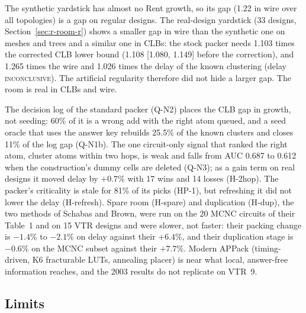  The synthetic yardstick has almost no Rent growth, so its gap (1.22 in wire over all topologies) is a gap on regular designs. The real-design yardstick (33 designs, Section~\ref{sec:r-room-r}) shows a smaller gap in wire than the synthetic one on meshes and trees and a similar one in CLBs: the stock packer needs 1.103 times the corrected CLB lower bound (1.108 [1.080, 1.149] before the correction), and 1.265 times the wire and 1.026 times the delay of the known clustering (delay \textsc{inconclusive}). The artificial regularity therefore did not hide a larger gap. The room is real in CLBs and wire.

 The decision log of the standard packer (Q-N2) places the CLB gap in growth, not seeding: 60\% of it is a wrong add with the right atom queued, and a seed oracle that uses the answer key rebuilds 25.5\% of the known clusters and closes 11\% of the log gap (Q-N1b). The one circuit-only signal that ranked the right atom, cluster atoms within two hops, is weak and falls from AUC 0.687 to 0.612 when the construction's dummy cells are deleted (Q-N3); as a gain term on real designs it moved delay by $+0.7\%$ with 17 wins and 14 losses (H-2hop). The packer's criticality is stale for 81\% of its picks (HP-1), but refreshing it did not lower the delay (H-refresh). Spare room (H-spare) and duplication (H-dup), the two methods of Schabas and Brown, were run on the 20 MCNC circuits of their Table~1 and on 15 VTR designs and were slower, not faster: their packing change is $-1.4\%$ to $-2.1\%$ on delay against their $+6.4\%$, and their duplication stage is $-0.6\%$ on the MCNC subset against their $+7.7\%$. Modern APPack (timing-driven, K6 fracturable LUTs, annealing placer) is near what local, answer-free information reaches, and the 2003 results do not replicate on VTR~9.

\subsection{Limits}
\label{sec:limits}

